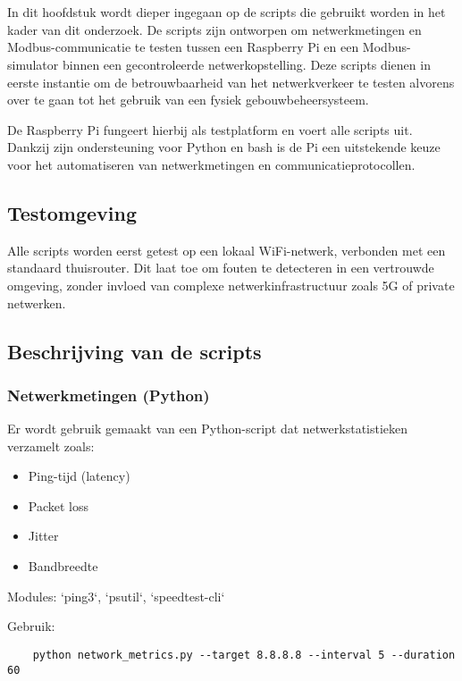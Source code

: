 \chapter{}%
\label{ch:scripts}

In dit hoofdstuk wordt dieper ingegaan op de scripts die gebruikt worden in het kader van dit onderzoek. De scripts zijn ontworpen om netwerkmetingen en Modbus-communicatie te testen tussen een Raspberry Pi en een Modbus-simulator binnen een gecontroleerde netwerkopstelling. Deze scripts dienen in eerste instantie om de betrouwbaarheid van het netwerkverkeer te testen alvorens over te gaan tot het gebruik van een fysiek gebouwbeheersysteem.

De Raspberry Pi fungeert hierbij als testplatform en voert alle scripts uit. Dankzij zijn ondersteuning voor Python en bash is de Pi een uitstekende keuze voor het automatiseren van netwerkmetingen en communicatieprotocollen.

\section{Testomgeving}

Alle scripts worden eerst getest op een lokaal WiFi-netwerk, verbonden met een standaard thuisrouter. Dit laat toe om fouten te detecteren in een vertrouwde omgeving, zonder invloed van complexe netwerkinfrastructuur zoals 5G of private netwerken.

\section{Beschrijving van de scripts}

\subsection{Netwerkmetingen (Python)}
Er wordt gebruik gemaakt van een Python-script dat netwerkstatistieken verzamelt zoals:

\begin{itemize}
    \item Ping-tijd (latency)
    \item Packet loss
    \item Jitter
    \item Bandbreedte
\end{itemize}

Modules: `ping3`, `psutil`, `speedtest-cli`

Gebruik:
\begin{verbatim}
    python network_metrics.py --target 8.8.8.8 --interval 5 --duration 60
\end{verbatim}

